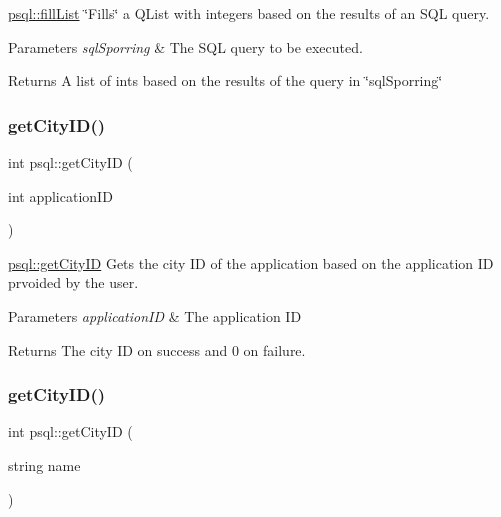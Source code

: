 \mbox{\hyperlink{classpsql_a2ad41caea89dc5af0b55b12f6394fbf5}{psql\+::fill\+List}} \char`\"{}\+Fills\char`\"{} a Q\+List with integers based on the results of an S\+QL query. 


\begin{DoxyParams}{Parameters}
{\em sql\+Sporring} & The S\+QL query to be executed. \\
\hline
\end{DoxyParams}
\begin{DoxyReturn}{Returns}
A list of ints based on the results of the query in \char`\"{}sql\+Sporring\char`\"{} 
\end{DoxyReturn}
\mbox{\label{classpsql_af3462a12dc106e0ca8df4fa8fcf28436}} 
\subsubsection{\texorpdfstring{getCityID()}{getCityID()}\hspace{0.1cm}{\footnotesize\ttfamily [1/2]}}
{\footnotesize\ttfamily int psql\+::get\+City\+ID (\begin{DoxyParamCaption}\item[{int}]{application\+ID }\end{DoxyParamCaption})}



\mbox{\hyperlink{classpsql_af3462a12dc106e0ca8df4fa8fcf28436}{psql\+::get\+City\+ID}} Gets the city ID of the application based on the application ID prvoided by the user. 


\begin{DoxyParams}{Parameters}
{\em application\+ID} & The application ID \\
\hline
\end{DoxyParams}
\begin{DoxyReturn}{Returns}
The city ID on success and 0 on failure. 
\end{DoxyReturn}
\mbox{\label{classpsql_a0c33b3f48064ba75abaa4b0b58eb1ccd}} 
\subsubsection{\texorpdfstring{getCityID()}{getCityID()}\hspace{0.1cm}{\footnotesize\ttfamily [2/2]}}
{\footnotesize\ttfamily int psql\+::get\+City\+ID (\begin{DoxyParamCaption}\item[{string}]{name }\end{DoxyParamCaption})}



